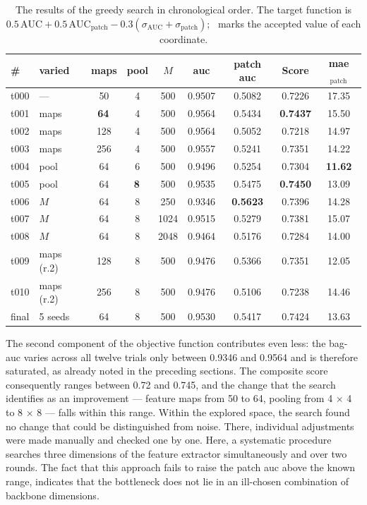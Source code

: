\documentclass[12pt,parskip = half, DIV=classic,listof=totoc]{scrartcl}
\begin{document}
			\begin{table}[htbp]
					\centering
					\scriptsize
					\label{tab:gwhd_greedy}
					\begin{tabular}{@{}llccccccc@{}}
						\toprule
						\# & varied & maps & pool & $M$ & \acs*{auc} & patch \acs*{auc} & Score & \acs*{mae}$_{\text{patch}}$ \\
						\midrule
						t000 & --- & 50 & 4 & 500 & 0.9507 & 0.5082 & 0.7226 & 17.35 \\
						\midrule
						t001 & maps & \textbf{64}\,\checkmark & 4 & 500 & 0.9564 & 0.5434 & \textbf{0.7437} & 15.50 \\
						t002 & maps & 128 & 4 & 500 & 0.9564 & 0.5052 & 0.7218 & 14.97 \\
						t003 & maps & 256 & 4 & 500 & 0.9557 & 0.5241 & 0.7351 & 14.22 \\
						\midrule
						t004 & pool & 64 & 6 & 500 & 0.9496 & 0.5254 & 0.7304 & \textbf{11.62} \\
						t005 & pool & 64 & \textbf{8}\,\checkmark & 500 & 0.9535 & 0.5475 & \textbf{0.7450} & 13.09 \\
						\midrule
						t006 & $M$ & 64 & 8 & 250 & 0.9346 & \textbf{0.5623} & 0.7396 & 14.28 \\
						t007 & $M$ & 64 & 8 & 1024 & 0.9515 & 0.5279 & 0.7381 & 15.07 \\
						t008 & $M$ & 64 & 8 & 2048 & 0.9464 & 0.5176 & 0.7284 & 14.00 \\
						\midrule
						t009 & maps (r.2) & 128 & 8 & 500 & 0.9476 & 0.5366 & 0.7351 & 12.05 \\
						t010 & maps (r.2) & 256 & 8 & 500 & 0.9476 & 0.5106 & 0.7238 & 14.46 \\
						\midrule
						final & 5 seeds & 64 & 8 & 500 & 0.9530 & 0.5417 & 0.7424 & 13.63 \\
						\bottomrule
					\end{tabular}
					\caption[The results of the greedy search in chronological order]{The results of the greedy search in chronological order. The target function is
					$0.5\,\mathrm{AUC} + 0.5\,\mathrm{AUC}_{\text{patch}} - 0.3(\sigma_{\mathrm{AUC}} +
					\sigma_{\text{patch}})$; \checkmark\ marks the accepted value of each coordinate.}
				\end{table}

			The second component of the objective function contributes even less: the bag-\acs*{auc}
			varies across all twelve trials only between 0.9346 and 0.9564 and is therefore saturated, as already noted in the preceding sections. The composite
			score consequently ranges between 0.72 and 0.745, and the change that the
			search identifies as an improvement — feature maps from 50 to 64, pooling from 4 × 4
			to 8 × 8 — falls within this range. Within the explored space, the search found no change that could be distinguished from noise.
			There, individual adjustments were made manually and
			checked one by one. Here, a systematic procedure searches three dimensions
			of the feature extractor simultaneously and over two rounds. The fact that this approach
			fails to raise the patch \ac{auc} above the known range, indicates that the bottleneck does not
			lie in an ill-chosen combination of backbone dimensions.
\end{document}
